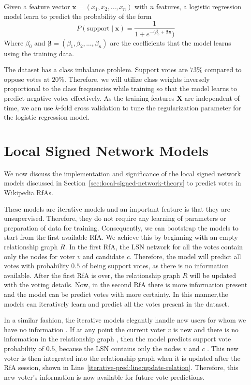 Given a feature vector $\mathbf{x}=(x_{1},x_{2},\dots,x_{n})$ with $n$ features, a logistic regression model learn to predict the probability of the form 
\begin{equation}
    P(\text{support} \mid \mathbf{x}) = \frac{1}{1+e^{-(\beta_{0} + \boldsymbol{\beta}\mathbf{x}})}
\end{equation}
Where $\beta_{0}$ and $\boldsymbol{\beta} = (\beta_{1},\beta_{2},\dots,\beta_{n})$ are the coefficients that the model learns using the training data.

The \wikirfa dataset has a class imbalance problem.
Support votes are $73\%$ compared to oppose votes at $20\%$.
Therefore, we will utilize class weights inversely proportional to the class frequencies while training so that the model learns to predict negative votes effectively. 
As the training features $\mathbf{X}$ are independent of time, we acn use $k$-fold cross validation to tune the regularization parameter for the logistic regression model.  

\section{Local Signed Network Models}
\label{sec:local-signed-network-implementation}
We now discuss the implementation and significance of the local signed network models discussed in Section~\ref{sec:local-signed-network-theory} to predict votes in Wikipedia RfAs.

These models are iterative models and an important feature is that they are unsupervised.
Therefore, they do not require any learning of parameters or preparation of data for training.
Consequently, we can bootstrap the models to start from the first available RfA.
We achieve this by beginning with an empty relationship graph $R$.
In the first RfA, the LSN network for all the votes contain only the nodes for voter $v$ and candidate $c$.
Therefore, the model will predict all votes with probability $0.5$ of being support votes, as there is no information available.
After the first RfA is over, the relationship graph $R$ will be updated with the voting details.
Now, in the second RfA there is more information present and the model can be predict votes with more certainty.
In this manner,the models can iteratively learn and predict all the votes present in the \wikirfa dataset.

In a similar fashion, the iterative models elegantly handle new users for whom we have no information .
If at any point the current voter $v$ is new and there is no information in the relationship graph , then the model predicts support vote probability of $0.5$, because the LSN contains only the nodes $v$ and $c$ .
This new voter is then integrated into the relationship graph when it is updated after the RfA session, shown in Line~\ref{iterative-pred:line:update-relation}.
Therefore, this new voter's information is now available for future vote predictions.

